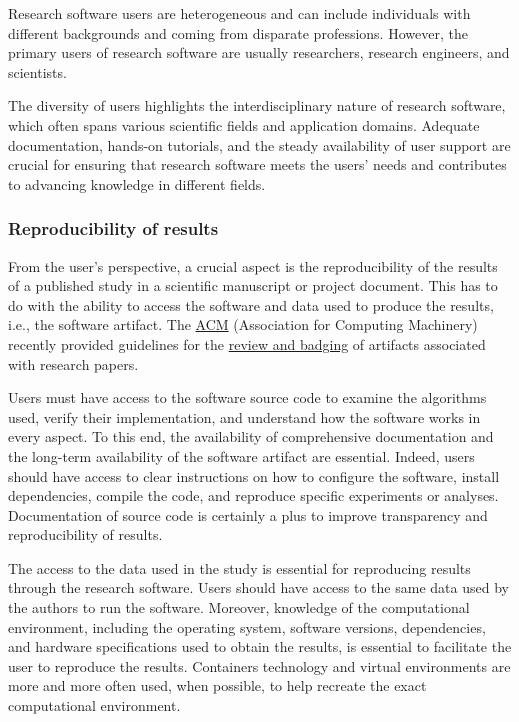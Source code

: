 Research software users are heterogeneous and can include individuals with different backgrounds and coming from disparate professions. However, the primary users of research software are usually researchers, research engineers, and scientists. 

The diversity of users highlights the interdisciplinary nature of research software, which often spans various scientific fields and application domains. Adequate documentation, hands-on tutorials, and the steady availability of user support are crucial for ensuring that research software meets the users' needs and contributes to advancing knowledge in different fields.  

\subsubsection*{Reproducibility of results}
From the user's perspective, a crucial aspect is the reproducibility of the results of a published study in a scientific manuscript or project document. This has to do with the ability to access the software and data used to produce the results, i.e., the software artifact. 
The \href{https://www.acm.org/}{ACM} (Association for Computing Machinery) recently provided guidelines for the \href{https://www.acm.org/publications/policies/artifact-review-and-badging-current}{review and badging} of artifacts associated with research papers. 

Users must have access to the software source code to examine the algorithms used, verify their implementation, and understand how the software works in every aspect.
To this end, the availability of comprehensive documentation and the long-term availability of the software artifact are essential. Indeed, users should have access to clear instructions on how to configure the software, install dependencies, compile the code, and reproduce specific experiments or analyses. Documentation of source code is certainly a plus to improve transparency and reproducibility of results.

The access to the data used in the study is essential for reproducing results through the research software. Users should have access to the same data used by the authors to run the software. Moreover, knowledge of the computational environment, including the operating system, software versions, dependencies, and hardware specifications used to obtain the results, is essential to facilitate the user to reproduce the results. Containers technology and virtual environments are more and more often used, when possible, to help recreate the exact computational environment.

